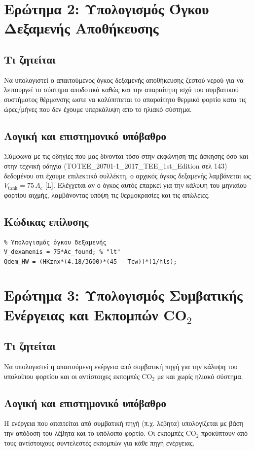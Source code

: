 \documentclass[10pt,a4paper]{article}
\begin{document}
\section{Ερώτημα 2: Υπολογισμός Όγκου Δεξαμενής Αποθήκευσης}
\subsection*{Τι ζητείται}
Να υπολογιστεί ο απαιτούμενος όγκος δεξαμενής αποθήκευσης ζεστού νερού για 
να λειτουργεί το σύστημα αποδοτικά καθώς και την απαραίτητη ισχύ του συμβατικού συστήματος θέρμανσης ωστε να 
καλύππτεται το απαραίτητο θερμικό φορτίο κατα τις ώρες/μήνες που δεν έχουμε υπερκάλυψη απο το ηλιακό σύστημα.

\subsection*{Λογική και επιστημονικό υπόβαθρο}
Σύμφωνα με τις οδηγίες που μας δίνονται τόσο στην εκφώνηση της άσκησης όσο και στην τεχνική οδηγία (TOTEE_20701-1_2017_TEE_1st_Edition σελ 143) 
δεδομένου οτι έχουμε επιλεκτικό συλλέκτη, ο αρχικός όγκος δεξαμενής λαμβάνεται ως 
$V_{\text{tank}} = 75\,A_c$ [\si{\liter}]. Ελέγχεται αν ο όγκος αυτός επαρκεί 
για την κάλυψη του μηνιαίου φορτίου αιχμής, λαμβάνοντας υπόψη τις 
θερμοκρασίες και τις απώλειες.

\subsection*{Κώδικας επίλυσης}
\begin{lstlisting}
% Υπολογισμός όγκου δεξαμενής
V_dexamenis = 75*Ac_found; % "lt"
Qdem_HW = (HKznx*(4.18/3600)*(45 - Tcw))*(1/hls);
\end{lstlisting}

\section{Ερώτημα 3: Υπολογισμός Συμβατικής Ενέργειας και Εκπομπών CO$_2$}
\subsection*{Τι ζητείται}
Να υπολογιστεί η απαιτούμενη ενέργεια από συμβατική πηγή για την κάλυψη του 
υπολοίπου φορτίου και οι αντίστοιχες εκπομπές CO$_2$ με και χωρίς ηλιακό 
σύστημα.

\subsection*{Λογική και επιστημονικό υπόβαθρο}
Η ενέργεια που απαιτείται από συμβατική πηγή (π.χ. λέβητα) υπολογίζεται με 
βάση την απόδοση του λέβητα και το υπόλοιπο φορτίο. Οι εκπομπές CO$_2$ 
προκύπτουν από τους αντίστοιχους συντελεστές εκπομπών για κάθε πηγή 
ενέργειας.
\end{document}
